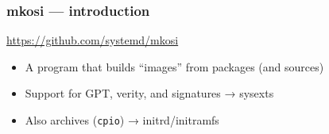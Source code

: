\documentclass[]{beamer}
\newcommand\pp{}
\begin{document}




\begin{frame}[fragile]
  \frametitle{mkosi — introduction}

  \url{https://github.com/systemd/mkosi}

  \pp

  \begin{itemize}
  \item A program that builds ``images'' from packages (and sources)
     \pp
   \item Support for GPT, verity, and signatures → sysexts
     \pp
   \item Also archives (\texttt{cpio}) → initrd/initramfs
  \end{itemize}
\end{frame}
\end{document}
